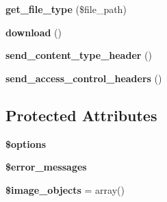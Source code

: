 \begin{DoxyCompactItemize}
\item 
\hypertarget{class_upload_handler_a7b08e79a00c5ed6fad76d59d1f9fd933}{{\bfseries get\-\_\-file\-\_\-type} (\$file\-\_\-path)}\label{class_upload_handler_a7b08e79a00c5ed6fad76d59d1f9fd933}

\item 
\hypertarget{class_upload_handler_a9422368b3447d2e775fd11b33b44c7a2}{{\bfseries download} ()}\label{class_upload_handler_a9422368b3447d2e775fd11b33b44c7a2}

\item 
\hypertarget{class_upload_handler_aff760533fb356bc3d70390c69a62271c}{{\bfseries send\-\_\-content\-\_\-type\-\_\-header} ()}\label{class_upload_handler_aff760533fb356bc3d70390c69a62271c}

\item 
\hypertarget{class_upload_handler_a22cb1d32c32c5ae76aa01abbed10bf6f}{{\bfseries send\-\_\-access\-\_\-control\-\_\-headers} ()}\label{class_upload_handler_a22cb1d32c32c5ae76aa01abbed10bf6f}

\end{DoxyCompactItemize}
\subsection*{Protected Attributes}
\begin{DoxyCompactItemize}
\item 
\hypertarget{class_upload_handler_a011800c63ece4cbbfa77136a20607023}{{\bfseries \$options}}\label{class_upload_handler_a011800c63ece4cbbfa77136a20607023}

\item 
{\bfseries \$error\-\_\-messages}
\item 
\hypertarget{class_upload_handler_a1bea35acf4eb75aeeb7fc667300b6a53}{{\bfseries \$image\-\_\-objects} = array()}\label{class_upload_handler_a1bea35acf4eb75aeeb7fc667300b6a53}

\end{DoxyCompactItemize}


